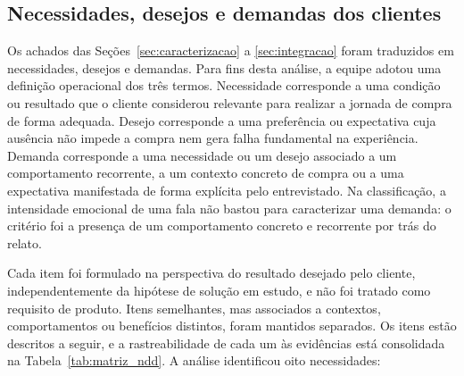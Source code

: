 \subsection{Necessidades, desejos e demandas dos clientes}
\label{sec:ndd}

Os achados das Seções~\ref{sec:caracterizacao} a \ref{sec:integracao} foram traduzidos em necessidades, desejos e demandas. Para fins desta análise, a equipe adotou uma definição operacional dos três termos. Necessidade corresponde a uma condição ou resultado que o cliente considerou relevante para realizar a jornada de compra de forma adequada. Desejo corresponde a uma preferência ou expectativa cuja ausência não impede a compra nem gera falha fundamental na experiência. Demanda corresponde a uma necessidade ou um desejo associado a um comportamento recorrente, a um contexto concreto de compra ou a uma expectativa manifestada de forma explícita pelo entrevistado. Na classificação, a intensidade emocional de uma fala não bastou para caracterizar uma demanda: o critério foi a presença de um comportamento concreto e recorrente por trás do relato.

Cada item foi formulado na perspectiva do resultado desejado pelo cliente, independentemente da hipótese de solução em estudo, e não foi tratado como requisito de produto. Itens semelhantes, mas associados a contextos, comportamentos ou benefícios distintos, foram mantidos separados. Os itens estão descritos a seguir, e a rastreabilidade de cada um às evidências está consolidada na Tabela~\ref{tab:matriz_ndd}. A análise identificou oito necessidades:

